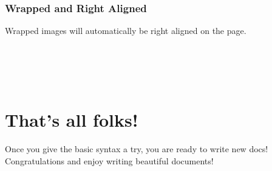 \subsubsection{Wrapped and Right Aligned}
Wrapped images will automatically be right aligned on the page.\\\\
\\
\\\\

\section{That's all folks!}
Once you give the basic syntax a try, you are ready to write new docs!\\Congratulations and enjoy writing beautiful documents!

